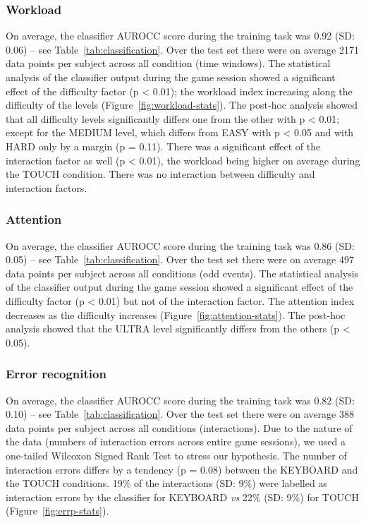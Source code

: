 \documentclass[]{sigchi}
\begin{document}
\subsubsection{Workload}\label{workload}

On average, the classifier AUROCC score during the training task was
0.92 (SD: 0.06) -- see Table~\ref{tab:classification}. Over the test set
there were on average 2171 data points per subject across all condition
(time windows). The statistical analysis of the classifier output during
the game session showed a significant effect of the difficulty factor (p
\textless{} 0.01); the workload index increasing along the difficulty of
the levels (Figure~\ref{fig:workload-stats}). The post-hoc analysis
showed that all difficulty levels significantly differs one from the
other with p \textless{} 0.01; except for the MEDIUM level, which
differs from EASY with p \textless{} 0.05 and with HARD only by a margin
(p = 0.11). There was a significant effect of the interaction factor as
well (p \textless{} 0.01), the workload being higher on average during
the TOUCH condition. There was no interaction between difficulty and
interaction factors.

\subsubsection{Attention}\label{attention}

On average, the classifier AUROCC score during the training task was
0.86 (SD: 0.05) -- see Table~\ref{tab:classification}. Over the test set
there were on average 497 data points per subject across all conditions
(odd events). The statistical analysis of the classifier output during
the game session showed a significant effect of the difficulty factor (p
\textless{} 0.01) but not of the interaction factor. The attention index
decreases as the difficulty increases
(Figure~\ref{fig:attention-stats}). The post-hoc analysis showed that
the ULTRA level significantly differs from the others (p \textless{}
0.05).

\subsubsection{Error recognition}\label{error-recognition}

On average, the classifier AUROCC score during the training task was
0.82 (SD: 0.10) -- see Table~\ref{tab:classification}. Over the test set
there were on average 388 data points per subject across all conditions
(interactions). Due to the nature of the data (numbers of interaction
errors across entire game sessions), we used a one-tailed Wilcoxon
Signed Rank Test to stress our hypothesis. The number of interaction
errors differs by a tendency (p = 0.08) between the KEYBOARD and the
TOUCH conditions. 19\% of the interactions (SD: 9\%) were labelled as
interaction errors by the classifier for KEYBOARD \emph{vs} 22\% (SD:
9\%) for TOUCH (Figure~\ref{fig:errp-stats}).
\end{document}
